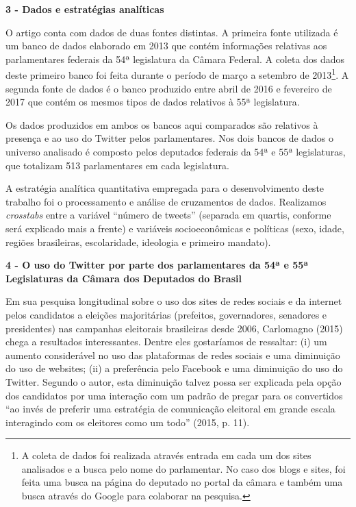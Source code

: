 \textbf{3 - Dados e estratégias analíticas}

O artigo conta com dados de duas fontes distintas. A primeira fonte
utilizada é um banco de dados elaborado em 2013 que contém informações
relativas aos parlamentares federais da 54ª legislatura da Câmara
Federal. A coleta dos dados deste primeiro banco foi feita durante o
período de março a setembro de 2013\footnote{A coleta de dados foi
  realizada através entrada em cada um dos sites analisados e a busca
  pelo nome do parlamentar. No caso dos blogs e sites, foi feita uma
  busca na página do deputado no portal da câmara e também uma busca
  através do Google para colaborar na pesquisa.}. A segunda fonte de
dados é o banco produzido entre abril de 2016 e fevereiro de 2017 que
contém os mesmos tipos de dados relativos à 55ª legislatura.

Os dados produzidos em ambos os bancos aqui comparados são relativos à
presença e ao uso do Twitter pelos parlamentares. Nos dois bancos de
dados o universo analisado é composto pelos deputados federais da 54ª e
55ª legislaturas, que totalizam 513 parlamentares em cada legislatura.

A estratégia analítica quantitativa empregada para o desenvolvimento
deste trabalho foi o processamento e análise de cruzamentos de dados.
Realizamos \emph{crosstabs} entre a variável ``número de tweets''
(separada em quartis, conforme será explicado mais a frente) e variáveis
socioeconômicas e políticas (sexo, idade, regiões brasileiras,
escolaridade, ideologia e primeiro mandato).

\textbf{4 - O uso do Twitter por parte dos parlamentares da 54ª e 55ª
Legislaturas da Câmara dos Deputados do Brasil }

Em sua pesquisa longitudinal sobre o uso dos sites de redes sociais e da
internet pelos candidatos a eleições majoritárias (prefeitos,
governadores, senadores e presidentes) nas campanhas eleitorais
brasileiras desde 2006, Carlomagno (2015) chega a resultados
interessantes. Dentre eles gostaríamos de ressaltar: (i) um aumento
considerável no uso das plataformas de redes sociais e uma diminuição do
uso de websites; (ii) a preferência pelo Facebook e uma diminuição do
uso do Twitter. Segundo o autor, esta diminuição talvez possa ser
explicada pela opção dos candidatos por uma interação com um padrão de
pregar para os convertidos ``ao invés de preferir uma estratégia de
comunicação eleitoral em grande escala interagindo com os eleitores como
um todo'' (2015, p. 11).

